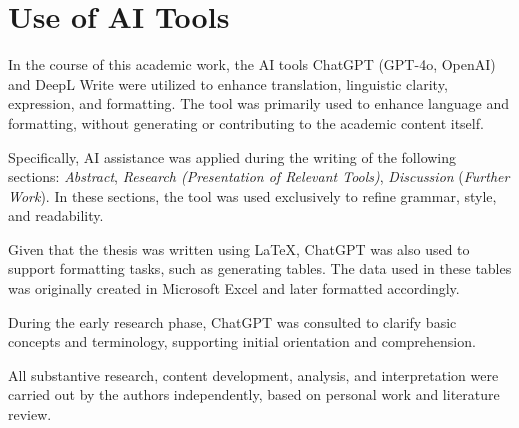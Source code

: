 \section*{Use of AI Tools}
In the course of this academic work, the AI tools ChatGPT (GPT-4o, OpenAI) and DeepL Write were utilized to enhance translation, linguistic clarity, expression, and formatting. The tool was primarily used to enhance language and formatting, without generating or contributing to the academic content itself.

Specifically, AI assistance was applied during the writing of the following sections: \textit{Abstract}, \textit{Research (Presentation of Relevant Tools)}, \textit{Discussion} (\textit{Further Work}). In these sections, the tool was used exclusively to refine grammar, style, and readability.

Given that the thesis was written using LaTeX,  ChatGPT was also used to support formatting tasks, such as generating tables. The data used in these tables was originally created in Microsoft Excel and later formatted accordingly.

During the early research phase, ChatGPT was consulted to clarify basic concepts and terminology, supporting initial orientation and comprehension.

All substantive research, content development, analysis, and interpretation were carried out by the authors independently, based on personal work and literature review.

